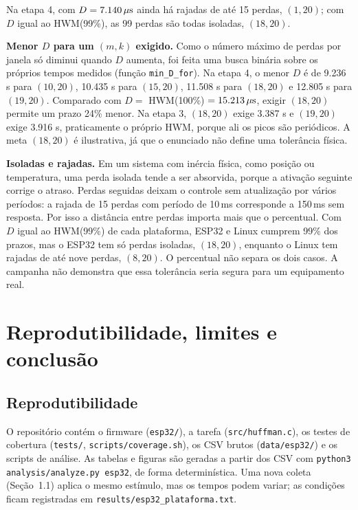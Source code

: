 \documentclass[11pt,a4paper]{article}
\newcommand{\us}{\ifmmode\,\mu\mathrm{s}\else\,\textmu s\fi}
\newcommand{\ms}{\,ms}
\begin{document}
Na etapa 4, com $D = 7.140\us$ ainda há rajadas de até 15 perdas, $(1,20)$; com
$D$ igual ao HWM(99\%), as 99 perdas são todas isoladas, $(18,20)$.

\textbf{Menor $D$ para um $(m,k)$ exigido.} Como o número máximo de perdas por
janela só diminui quando $D$ aumenta, foi feita uma busca binária sobre os
próprios tempos medidos (função \texttt{min\_D\_for}). Na etapa 4, o menor $D$
é de 9.236\us{} para $(10,20)$, 10.435\us{} para $(15,20)$, 11.508\us{} para
$(18,20)$ e 12.805\us{} para $(19,20)$. Comparado com $D = $ HWM(100\%) $=
15.213\us$, exigir $(18,20)$ permite um prazo 24\% menor. Na etapa 3, $(18,20)$
exige 3.387\us{} e $(19,20)$ exige 3.916\us, praticamente o próprio HWM, porque
ali os picos são periódicos.
A meta $(18,20)$ é ilustrativa, já que o enunciado não define uma tolerância
física.

\textbf{Isoladas e rajadas.} Em um sistema com inércia física, como posição ou
temperatura, uma perda isolada tende a ser absorvida, porque a ativação
seguinte corrige o atraso. Perdas seguidas deixam o controle sem atualização
por vários períodos: a rajada de 15 perdas com período de 10\ms{} corresponde a
150\ms{} sem resposta. Por isso a distância entre perdas importa mais que o
percentual. Com $D$ igual ao HWM(99\%) de cada plataforma, ESP32 e Linux
cumprem 99\% dos prazos, mas o ESP32 tem só perdas isoladas, $(18,20)$,
enquanto o Linux tem rajadas de até nove perdas, $(8,20)$. O percentual não
separa os dois casos. A campanha não demonstra que essa tolerância seria segura
para um equipamento real.

\section{Reprodutibilidade, limites e conclusão}
\subsection{Reprodutibilidade}
O repositório contém o firmware (\texttt{esp32/}), a tarefa
(\texttt{src/huffman.c}), os testes de cobertura (\texttt{tests/},
\texttt{scripts/coverage.sh}), os CSV brutos (\texttt{data/esp32/}) e os
scripts de análise. As tabelas e figuras são geradas a partir dos CSV com
\texttt{python3 analysis/analyze.py esp32}, de forma determinística. Uma nova
coleta (Seção~1.1) aplica o mesmo estímulo, mas os tempos podem variar; as
condições ficam registradas em \texttt{results/esp32\_plataforma.txt}.
\end{document}
